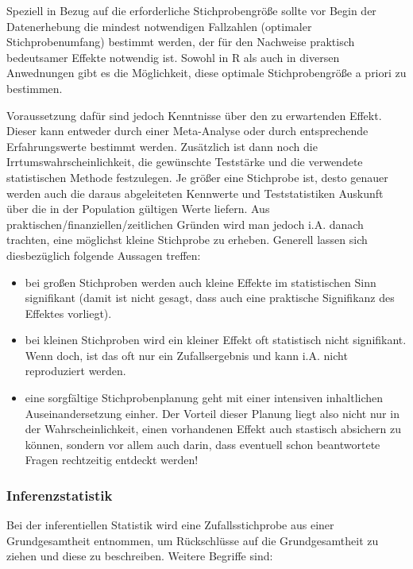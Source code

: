 \documentclass[]{article}
\providecommand{\tightlist}{%
  \setlength{\itemsep}{0pt}\setlength{\parskip}{0pt}}
\begin{document}
Speziell in Bezug auf die erforderliche Stichprobengröße sollte vor
Begin der Datenerhebung die mindest notwendigen Fallzahlen (optimaler
Stichprobenumfang) bestimmt werden, der für den Nachweise praktisch
bedeutsamer Effekte notwendig ist. Sowohl in R als auch in diversen
Anwednungen gibt es die Möglichkeit, diese optimale Stichprobengröße a
priori zu bestimmen.

Voraussetzung dafür sind jedoch Kenntnisse über den zu erwartenden
Effekt. Dieser kann entweder durch einer Meta-Analyse oder durch
entsprechende Erfahrungswerte bestimmt werden. Zusätzlich ist dann noch
die Irrtumswahrscheinlichkeit, die gewünschte Teststärke und die
verwendete statistischen Methode festzulegen. Je größer eine Stichprobe
ist, desto genauer werden auch die daraus abgeleiteten Kennwerte und
Teststatistiken Auskunft über die in der Population gültigen Werte
liefern. Aus praktischen/finanziellen/zeitlichen Gründen wird man jedoch
i.A. danach trachten, eine möglichst kleine Stichprobe zu erheben.
Generell lassen sich diesbezüglich folgende Aussagen treffen:

\begin{itemize}
\tightlist
\item
  bei großen Stichproben werden auch kleine Effekte im statistischen
  Sinn signifikant (damit ist nicht gesagt, dass auch eine praktische
  Signifikanz des Effektes vorliegt).
\item
  bei kleinen Stichproben wird ein kleiner Effekt oft statistisch nicht
  signifikant. Wenn doch, ist das oft nur ein Zufallsergebnis und kann
  i.A. nicht reproduziert werden.
\item
  eine sorgfältige Stichprobenplanung geht mit einer intensiven
  inhaltlichen Auseinandersetzung einher. Der Vorteil dieser Planung
  liegt also nicht nur in der Wahrscheinlichkeit, einen vorhandenen
  Effekt auch stastisch absichern zu können, sondern vor allem auch
  darin, dass eventuell schon beantwortete Fragen rechtzeitig entdeckt
  werden!
\end{itemize}

\subsubsection*{Inferenzstatistik}\label{inferenzstatistik}

Bei der inferentiellen Statistik wird eine Zufallsstichprobe aus einer
Grundgesamtheit entnommen, um Rückschlüsse auf die Grundgesamtheit zu
ziehen und diese zu beschreiben. Weitere Begriffe sind:
\end{document}
